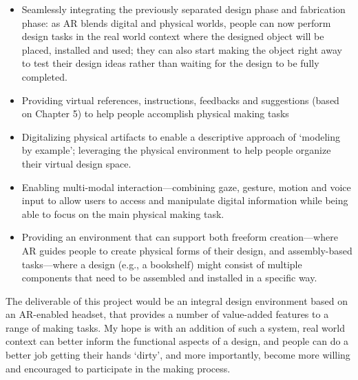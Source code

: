 \begin{itemize}
	\item Seamlessly integrating the previously separated design phase and fabrication phase: as AR blends digital and physical worlds, people can now perform design tasks in the real world context where the designed object will be placed, installed and used; they can also start making the object right away to test their design ideas rather than waiting for the design to be fully completed.
	\item Providing virtual references, instructions, feedbacks and suggestions (based on Chapter 5) to help people accomplish physical making tasks
	\item Digitalizing physical artifacts to enable a descriptive approach of `modeling by example'; leveraging the physical environment to help people organize their virtual design space.
	\item Enabling multi-modal interaction---combining gaze, gesture, motion and voice input to allow users to access and manipulate digital information while being able to focus on the main physical making task.
	\item Providing an environment that can support both freeform creation---where AR guides people to create physical forms of their design, and assembly-based tasks---where a design (e.g., a bookshelf) might consist of multiple components that need to be assembled and installed in a specific way.
\end{itemize}

The deliverable of this project would be an integral design environment based on an AR-enabled headset, that provides a number of value-added features to a range of making tasks. My hope is with an addition of such a system, real world context can better inform the functional aspects of a design, and people can do a better job getting their hands `dirty', and more importantly, become more willing and encouraged to participate in the making process.